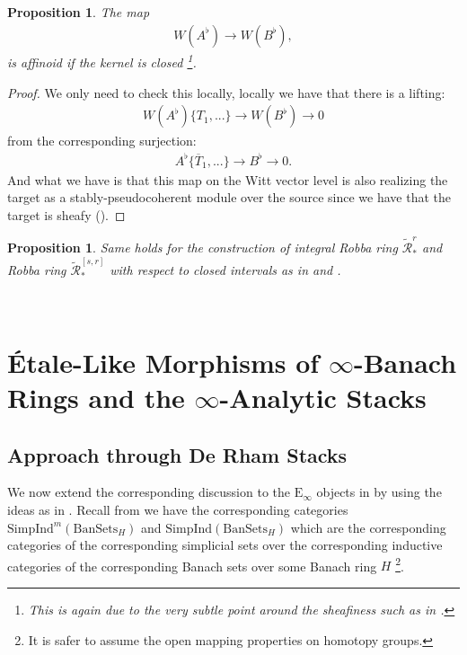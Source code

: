 \documentclass[12pt]{amsart}
\newtheorem{proposition}[theorem]{Proposition}
\theoremstyle{definition}
\numberwithin{equation}{section}
\begin{document}
\begin{proposition}
The map 
\begin{align}
W(A^\flat)\rightarrow W(B^\flat),	
\end{align}
is affinoid if the kernel is closed \footnote[1]{This is again due to the very subtle point around the sheafiness such as in \cite[Theorem 1.4.20]{Ked1}.}.	
\end{proposition}

\begin{proof}
We only need to check this locally, locally we have that there is a lifting:
\begin{align}
W(A^\flat)\{T_1,...\}\rightarrow W(B^\flat)\rightarrow 0	
\end{align}
from the corresponding surjection:
\begin{align}
A^\flat \{\overline{T}_1,...\}\rightarrow B^\flat \rightarrow 0.	
\end{align}
And what we have is that this map on the Witt vector level is also realizing the target as a stably-pseudocoherent module over the source since we have that the target is sheafy (\cite[Theorem 1.4.20]{Ked1}). 
\end{proof}


\begin{proposition}
Same holds for the construction of integral Robba ring $\widetilde{\mathcal{R}}^r_*$ and Robba ring $\widetilde{\mathcal{R}}^{[s,r]}_*$ with respect to closed intervals as in \cite{KL1} and \cite{KL2}.	
\end{proposition}









\


\section{\'Etale-Like Morphisms of $\infty$-Banach Rings and the $\infty$-Analytic Stacks}


\subsection{Approach through De Rham Stacks}


\indent We now extend the corresponding discussion to the $\mathrm{E}_\infty$ objects in \cite[Remark 3.16]{BBBK} by using the ideas as in \cite{R}. Recall from \cite[Theorem 3.14]{BBBK} we have the corresponding categories $\mathrm{Simp}\mathrm{Ind}^m(\mathrm{BanSets}_{H})$ and $\mathrm{Simp}\mathrm{Ind}(\mathrm{BanSets}_{H})$ which are the corresponding categories of the corresponding simplicial sets over the corresponding inductive categories of the corresponding Banach sets over some Banach ring $H$ \footnote{It is safer to assume the open mapping properties on homotopy groups.}.
\end{document}
